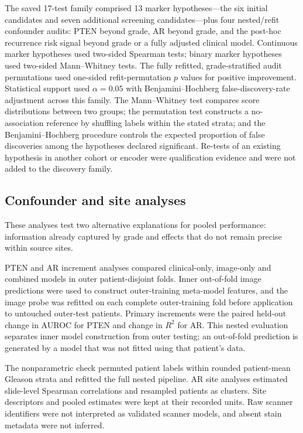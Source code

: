 The saved 17-test family comprised 13 marker hypotheses---the six initial candidates and
seven additional screening candidates---plus four nested/refit confounder audits: PTEN
beyond grade, AR beyond grade, and the post-hoc recurrence risk signal beyond grade or a
fully adjusted clinical model.
Continuous marker hypotheses used two-sided Spearman tests; binary marker hypotheses used
two-sided Mann--Whitney tests. The fully refitted, grade-stratified audit permutations used
one-sided refit-permutation $p$ values for positive improvement. Statistical support used
$\alpha=0.05$ with Benjamini--Hochberg false-discovery-rate adjustment across this family.
The Mann--Whitney test compares score distributions between two groups; the permutation
test constructs a no-association reference by shuffling labels within the stated strata;
and the Benjamini--Hochberg procedure controls the expected proportion of false discoveries
among the hypotheses declared significant.
Re-tests of an existing hypothesis in another cohort or encoder were qualification evidence
and were not added to the discovery family.

\subsection{Confounder and site analyses}

These analyses test two alternative explanations for pooled performance: information already
captured by grade and effects that do not remain precise within source sites.

PTEN and AR increment analyses compared clinical-only, image-only and combined models in
outer patient-disjoint folds. Inner out-of-fold image predictions were used to construct
outer-training meta-model features, and the image probe was refitted on each complete
outer-training fold before application to untouched outer-test patients. Primary increments
were the paired held-out change in AUROC for PTEN and change in $R^2$ for AR.
This nested evaluation separates inner model construction from outer testing; an out-of-fold
prediction is generated by a model that was not fitted using that patient's data.

The nonparametric check permuted patient labels within rounded patient-mean Gleason strata
and refitted the full nested pipeline. AR site analyses estimated slide-level Spearman
correlations and resampled patients as clusters. Site descriptors and pooled estimates were
kept at their recorded units. Raw scanner identifiers were not interpreted as validated
scanner models, and absent stain metadata were not inferred.

